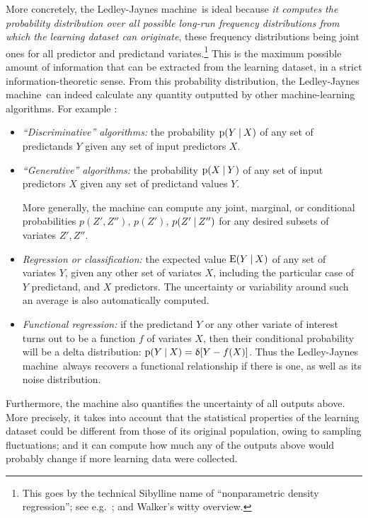 \documentclass[utf8]{FrontiersinHarvard} %
\newcommand*{\sect}{\S}%
\newcommand*{\eg}{{e.g.}}
\newcommand*{\p}{\mathrm{p}}%
\newcommand*{\E}{\mathrm{E}}
\renewcommand*{\|}[1][]{\nonscript\:#1\vert\nonscript\:\mathopen{}}
\newcommand*{\delt}{\updelta}
\newcommand*{\ljm}{Ledley-Jaynes machine}
\begin{document}
More concretely, the \ljm\ is ideal because \emph{it computes the probability distribution over all possible long-run frequency distributions from which the learning dataset can originate}, these frequency distributions being joint ones for all predictor and predictand variates.\footnote{This goes by the technical Sibylline name of \enquote{nonparametric density regression}; see \eg\ \citet{rodriguezetal2009,bhattacharyaetal2010}; and Walker's \citeyearpar{walker2010} witty overview.} This is the maximum possible amount of information that can be extracted from the learning dataset, in a strict information-theoretic sense. From this probability distribution, the \ljm\ can indeed calculate any quantity outputted by other machine-learning algorithms. For example \citep[for terminology see \eg][\sect~8.6]{murphy2012}:
\begin{itemize}
\item \emph{\enquote{Discriminative} algorithms:} the probability $\p(Y \| X)$ of any set of predictands $Y$ given any set of input predictors $X$.

\item \emph{\enquote{Generative} algorithms:}  the probability $\p(X \| Y)$ of any set of input predictors $X$ given any set of predictand values $Y$.

  More generally, the machine can compute any joint, marginal, or conditional probabilities $p(Z',Z'')$, $p(Z')$, $p(Z'\|Z'')$ for any desired subsets of variates $Z', Z''$.

\item \emph{Regression or classification:} the expected value $\E(Y\|X)$ of any set of variates $Y$, given any other set of variates $X$, including the particular case of $Y$ predictand, and $X$ predictors. The uncertainty or variability around such an average is also automatically computed.
  
\item \emph{Functional regression:} if the predictand $Y$ or any other variate of interest turns out to be a function $f$ of variates $X$, then their conditional probability will be a delta distribution: $\p(Y\|X) = \delt[Y-f(X)]$.
  Thus the \ljm\ always recovers a functional relationship if there is one, as well as its noise distribution.
\end{itemize}
Furthermore, the machine also quantifies the uncertainty of all outputs above. More precisely, it takes into account that the statistical properties of the learning dataset could be different from those of its original population, owing to sampling fluctuations; and it can compute how much any of the outputs above would probably change if more learning data were collected.
\end{document}
